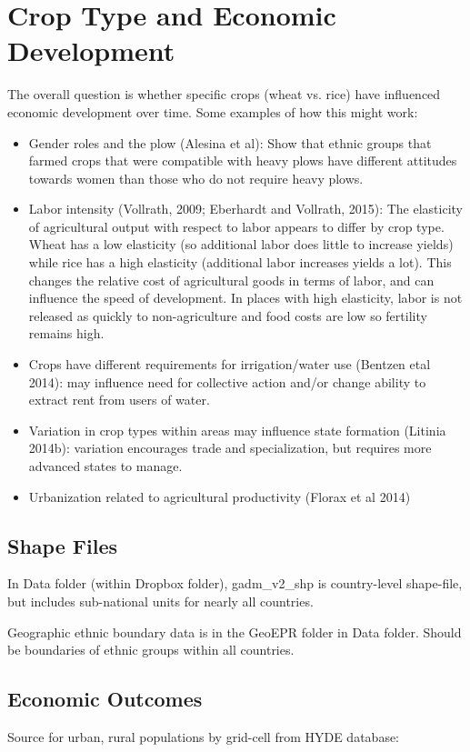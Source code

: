 \documentclass[10pt]{article}
\begin{document}
\onehalfspacing 

\section{Crop Type and Economic Development}
The overall question is whether specific crops (wheat vs. rice) have influenced economic development over time. Some examples of how this might work: 
\begin{itemize}
	\item Gender roles and the plow (Alesina et al): Show that ethnic groups that farmed crops that were compatible with heavy plows have different attitudes towards women than those who do not require heavy plows.
	\item Labor intensity (Vollrath, 2009; Eberhardt and Vollrath, 2015): The elasticity of agricultural output with respect to labor appears to differ by crop type. Wheat has a low elasticity (so additional labor does little to increase yields) while rice has a high elasticity (additional labor increases yields a lot). This changes the relative cost of agricultural goods in terms of labor, and can influence the speed of development. In places with high elasticity, labor is not released as quickly to non-agriculture and food costs are low so fertility remains high.
	\item Crops have different requirements for irrigation/water use (Bentzen etal 2014): may influence need for collective action and/or change ability to extract rent from users of water. 
	\item Variation in crop types within areas may influence state formation (Litinia 2014b): variation encourages trade and specialization, but requires more advanced states to manage.
	\item Urbanization related to agricultural productivity (Florax et al 2014)
\end{itemize}

\subsection{Shape Files}
In Data folder (within Dropbox folder), gadm\_v2\_shp is country-level shape-file, but includes sub-national units for nearly all countries.

Geographic ethnic boundary data is in the GeoEPR folder in Data folder. Should be boundaries of ethnic groups within all countries.

\subsection{Economic Outcomes}
Source for urban, rural populations by grid-cell from HYDE database:
\end{document}
